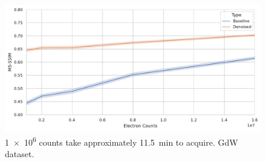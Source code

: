 \begin{figure}[h]
    \centering
    \includegraphics[width=1\linewidth]{images/nn_gdw_msssim.pdf}
    \caption{\num{1e6} counts take approximately \qty{11.5}{min} to acquire. \gls{GdW} dataset.}
    \label{fig:gdw-test-metirc}
\end{figure}






